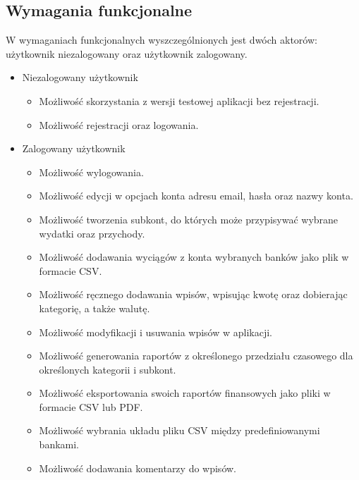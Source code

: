 \documentclass{article}
\begin{document}
	\subsection{Wymagania funkcjonalne}
	W wymaganiach funkcjonalnych wyszczególnionych jest dwóch aktorów: użytkownik niezalogowany oraz użytkownik zalogowany.
	\begin{itemize}
		\item Niezalogowany użytkownik
			\begin{itemize}
				\item Możliwość skorzystania z wersji testowej aplikacji bez rejestracji.
				\item Możliwość rejestracji oraz logowania.
			\end{itemize}

		\item Zalogowany użytkownik
			\begin{itemize}
				\item Możliwość wylogowania.
				\item Możliwość edycji w opcjach konta adresu email, hasła oraz nazwy konta.
				\item Możliwość tworzenia subkont, do których może przypisywać wybrane wydatki oraz przychody.
				\item Możliwość dodawania wyciągów z konta wybranych banków jako plik w formacie CSV.
				\item Możliwość ręcznego dodawania wpisów, wpisując kwotę oraz dobierając kategorię, a także walutę.
				\item Możliwość modyfikacji i usuwania wpisów w aplikacji.
				\item Możliwość generowania raportów z określonego przedziału czasowego dla określonych kategorii i subkont.
				\item Możliwość eksportowania swoich raportów finansowych jako pliki w formacie CSV lub PDF.
				\item Możliwość wybrania układu pliku CSV między predefiniowanymi bankami.
				\item Możliwość dodawania komentarzy do wpisów.
			\end{itemize}
	\end{itemize}
\end{document}
